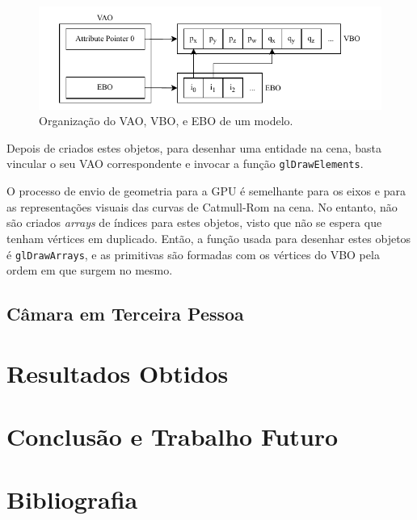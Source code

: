 \documentclass[12pt, a4paper]{article}
\begin{document}
\begin{figure}[H]
    \centering
    \includegraphics[width=\textwidth]{res/phase3/VAO.pdf}
    \caption{Organização do VAO, VBO, e EBO de um modelo.}
\end{figure}

Depois de criados estes objetos, para desenhar uma entidade na cena, basta vincular o seu VAO
correspondente e invocar a função \texttt{glDrawElements}.

O processo de envio de geometria para a GPU é semelhante para os eixos e para as representações
visuais das curvas de Catmull-Rom na cena. No entanto, não são criados \emph{arrays} de índices para
estes objetos, visto que não se espera que tenham vértices em duplicado. Então, a função usada para
desenhar estes objetos é \texttt{glDrawArrays}, e as primitivas são formadas com os vértices do VBO
pela ordem em que surgem no mesmo.

\subsection{Câmara em Terceira Pessoa}

\section{Resultados Obtidos}

\section{Conclusão e Trabalho Futuro}

\begingroup
\section{Bibliografia}
\renewcommand{\section}[2]{}
\end{document}
